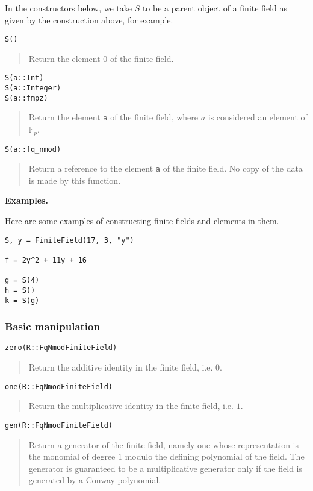 \documentclass[a4paper,10pt]{article}
\newcommand{\F}{\mathbb{F}}
\newcommand{\code}{\lstinline}
\newcommand{\desc}[1]{\vspace{-3mm}\begin{quote}#1\end{quote}}
\begin{document}
{{In the constructors below, we take $S$ to be a parent object of a finite field
as given by the construction above, for example.

\begin{lstlisting}
S()
\end{lstlisting}

\desc{Return the element $0$ of the finite field.}

\begin{lstlisting}
S(a::Int)
S(a::Integer)
S(a::fmpz)
\end{lstlisting}

\desc{Return the element \code{a} of the finite field, where $a$ is considered 
an element of $\F_p$.}

\begin{lstlisting}
S(a::fq_nmod)
\end{lstlisting}

\desc{Return a reference to the element \code{a} of the finite field. No copy
of the data is made by this function.}

\textbf{Examples.}

Here are some examples of constructing finite fields and elements in them.

\begin{lstlisting}
S, y = FiniteField(17, 3, "y")

f = 2y^2 + 11y + 16

g = S(4)
h = S()
k = S(g)
\end{lstlisting}

\subsubsection{Basic manipulation}

\begin{lstlisting}
zero(R::FqNmodFiniteField)
\end{lstlisting}

\desc{Return the additive identity in the finite field, i.e. $0$.}

\begin{lstlisting}
one(R::FqNmodFiniteField)
\end{lstlisting}

\desc{Return the multiplicative identity in the finite field, i.e. $1$.}

\begin{lstlisting}
gen(R::FqNmodFiniteField)
\end{lstlisting}

\desc{Return a generator of the finite field, namely one whose
representation is the monomial of degree $1$ modulo the defining
polynomial of the field. The generator is guaranteed to be a multiplicative 
generator only if the field is generated by a Conway polynomial.}

}}
\end{document}
